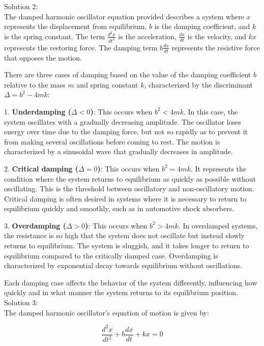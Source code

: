 \documentclass[a4paper,11pt]{article}
\begin{document}
\noindent Solution 2: \\

The damped harmonic oscillator equation provided describes a system where \(x\) represents the displacement from equilibrium, \(b\) is the damping coefficient, and \(k\) is the spring constant. The term \(\frac{d^2x}{dt^2}\) is the acceleration, \(\frac{dx}{dt}\) is the velocity, and \(kx\) represents the restoring force. The damping term \(b\frac{dx}{dt}\) represents the resistive force that opposes the motion.

There are three cases of damping based on the value of the damping coefficient \(b\) relative to the mass \(m\) and spring constant \(k\), characterized by the discriminant \(\Delta = b^2 - 4mk\):

1. \textbf{Underdamping (\(\Delta < 0\))}: This occurs when \(b^2 < 4mk\). In this case, the system oscillates with a gradually decreasing amplitude. The oscillator loses energy over time due to the damping force, but not so rapidly as to prevent it from making several oscillations before coming to rest. The motion is characterized by a sinusoidal wave that gradually decreases in amplitude.

2. \textbf{Critical damping (\(\Delta = 0\))}: This occurs when \(b^2 = 4mk\). It represents the condition where the system returns to equilibrium as quickly as possible without oscillating. This is the threshold between oscillatory and non-oscillatory motion. Critical damping is often desired in systems where it is necessary to return to equilibrium quickly and smoothly, such as in automotive shock absorbers.

3. \textbf{Overdamping (\(\Delta > 0\))}: This occurs when \(b^2 > 4mk\). In overdamped systems, the resistance is so high that the system does not oscillate but instead slowly returns to equilibrium. The system is sluggish, and it takes longer to return to equilibrium compared to the critically damped case. Overdamping is characterized by exponential decay towards equilibrium without oscillations.

Each damping case affects the behavior of the system differently, influencing how quickly and in what manner the system returns to its equilibrium position. \\

\noindent Solution 3: \\

The damped harmonic oscillator's equation of motion is given by:

\[
\frac{d^{2}x}{dt^{2}} + b\frac{dx}{dt}+kx=0
\]
\end{document}
